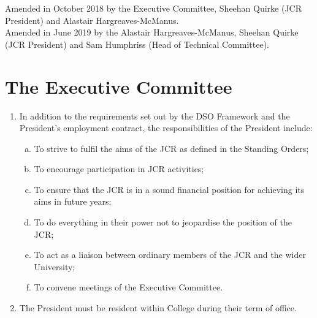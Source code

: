 \documentclass[12pt]{article}  %
\begin{document}
Amended in October 2018 by the Executive Committee, Sheehan Quirke (JCR President) and Alastair Hargreaves-McManus.\\
Amended in June 2019 by the Alastair Hargreaves-McManus, Sheehan Quirke (JCR President) and Sam Humphriss (Head of Technical Committee).
\newpage
\tableofcontents{}
\newpage


\section{The Executive Committee}
\begin{enumerate}
    \subsection{The President}
    \item In addition to the requirements set out by the DSO Framework and the President’s employment contract, the responsibilities of the President include:
    \begin{enumerate}[(a)]
        \item To strive to fulfil the aims of the JCR as defined in the Standing Orders;
        \item To encourage participation in JCR activities;
        \item To ensure that the JCR is in a sound financial position for achieving its aims in future years;
        \item To do everything in their power not to jeopardise the position of the JCR;
        \item To act as a liaison between ordinary members of the JCR and the wider University;
        \item To convene meetings of the Executive Committee.
    \end{enumerate}
    \item The President must be resident within College during their term of office.

\end{enumerate}
\end{document}
